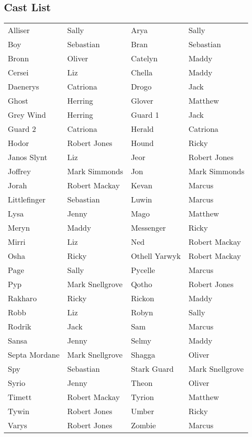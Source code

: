 \subsection*{Cast List}
\begin{tabular}{ll|ll}\\
Alliser & Sally &  Arya & Sally\\
Boy & Sebastian &  Bran & Sebastian\\
Bronn & Oliver &  Catelyn & Maddy\\
Cersei & Liz &  Chella & Maddy\\
Daenerys & Catriona &  Drogo & Jack\\
Ghost & Herring &  Glover & Matthew\\
Grey Wind & Herring &  Guard 1 & Jack\\
Guard 2 & Catriona &  Herald & Catriona\\
Hodor & Robert Jones &  Hound & Ricky\\
Janos Slynt & Liz &  Jeor & Robert Jones\\
Joffrey & Mark Simmonds &  Jon & Mark Simmonds\\
Jorah & Robert Mackay &  Kevan & Marcus\\
Littlefinger & Sebastian &  Luwin & Marcus\\
Lysa & Jenny &  Mago & Matthew\\
Meryn & Maddy &  Messenger & Ricky\\
Mirri & Liz &  Ned & Robert Mackay\\
Osha & Ricky &  Othell Yarwyk & Robert Mackay\\
Page & Sally &  Pycelle & Marcus\\
Pyp & Mark Snellgrove &  Qotho & Robert Jones\\
Rakharo & Ricky &  Rickon & Maddy\\
Robb & Liz &  Robyn & Sally\\
Rodrik & Jack &  Sam & Marcus\\
Sansa & Jenny &  Selmy & Maddy\\
Septa Mordane & Mark Snellgrove &  Shagga & Oliver\\
Spy & Sebastian &  Stark Guard & Mark Snellgrove\\
Syrio & Jenny &  Theon & Oliver\\
Timett & Robert Mackay &  Tyrion & Matthew\\
Tywin & Robert Jones &  Umber & Ricky\\
Varys & Robert Jones &  Zombie & Marcus\\
\end{tabular}
